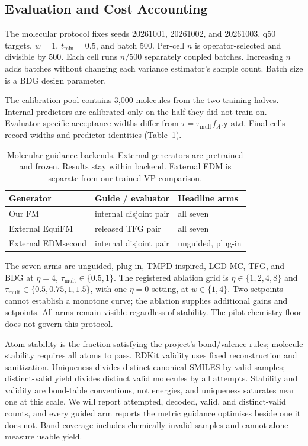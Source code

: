 \documentclass{article}
\begin{document}
\subsection{Evaluation and Cost Accounting}\label{app:evaluation}
The molecular protocol fixes seeds 20261001, 20261002, and 20261003, q50 targets, $w=1$, $t_{\min}=0.5$, and batch 500. Per-cell $n$ is operator-selected and divisible by 500. Each cell runs $n/500$ separately coupled batches. Increasing $n$ adds batches without changing each variance estimator's sample count. Batch size is a BDG design parameter.

The calibration pool contains 3{,}000 molecules from the two training halves. Internal predictors are calibrated only on the half they did not train on. Evaluator-specific acceptance widths differ from $\tau=\tau_{\mathrm{mult}}f_A.\texttt{y\_std}$. Final cells record widths and predictor identities (Table~\ref{tab:backends}).

\begin{table}[!htbp]
\centering\small
\caption{Molecular guidance backends. External generators are pretrained and frozen. Results stay within backend. External EDM is separate from our trained VP comparison.}
\label{tab:backends}
\begin{tabular}{lll}
\toprule
Generator & Guide / evaluator & Headline arms\\
\midrule
Our FM & internal disjoint pair & all seven\\
External EquiFM & released TFG pair & all seven\\
External EDMsecond & internal disjoint pair & unguided, plug-in\\
\bottomrule
\end{tabular}
\end{table}

The seven arms are unguided, plug-in, TMPD-inspired, LGD-MC, TFG, and BDG at $\eta=4$, $\tau_{\mathrm{mult}}\in\{0.5,1\}$. The registered ablation grid is $\eta\in\{1,2,4,8\}$ and $\tau_{\mathrm{mult}}\in\{0.5,0.75,1,1.5\}$, with one $\eta=0$ setting, at $w\in\{1,4\}$. Two setpoints cannot establish a monotone curve; the ablation supplies additional gains and setpoints. All arms remain visible regardless of stability. The pilot chemistry floor does not govern this protocol.

Atom stability is the fraction satisfying the project's bond/valence rules; molecule stability requires all atoms to pass. RDKit validity uses fixed reconstruction and sanitization. Uniqueness divides distinct canonical SMILES by valid samples; distinct-valid yield divides distinct valid molecules by all attempts. Stability and validity are bond-table conventions, not energies, and uniqueness saturates near one at this scale. We will report attempted, decoded, valid, and distinct-valid counts, and every guided arm reports the metric guidance optimises beside one it does not. Band coverage includes chemically invalid samples and cannot alone measure usable yield.
\end{document}
